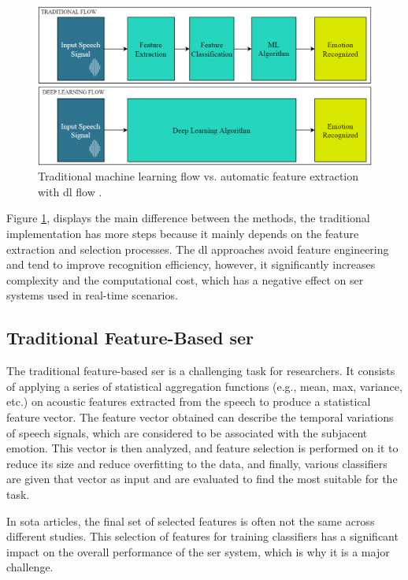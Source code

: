 \begin{figure}[h]
	\centering
	\includegraphics[width=\linewidth]{figs/2_state_of_the_art/methods.png}
	\caption{Traditional machine learning flow vs. automatic feature extraction with \ac{dl} flow \cite{Khalil2019}.}
	\label{fig:methods}
\end{figure}

Figure \ref{fig:methods}, displays the main difference between the methods, the traditional implementation has more steps because it mainly depends on the feature extraction and selection processes. The \ac{dl} approaches avoid feature engineering and tend to improve recognition efficiency, however, it significantly increases complexity and the computational cost, which has a negative effect on \ac{ser} systems used in real-time scenarios.

\subsection{Traditional Feature-Based \ac{ser}}

The traditional feature-based \ac{ser} is a challenging task for researchers. It consists of applying a series of statistical aggregation functions (e.g., mean, max, variance, etc.) on acoustic features extracted from the speech to produce a statistical feature vector. The feature vector obtained can describe the temporal variations of speech signals, which are considered to be associated with the subjacent emotion. This vector is then analyzed, and feature selection is performed on it to reduce its size and reduce overfitting to the data, and finally, various classifiers are given that vector as input and are evaluated to find the most suitable for the task.

In \ac{sota} articles, the final set of selected features is often not the same across different studies. This selection of features for training classifiers has a significant impact on the overall performance of the \ac{ser} system, which is why it is a major challenge.

